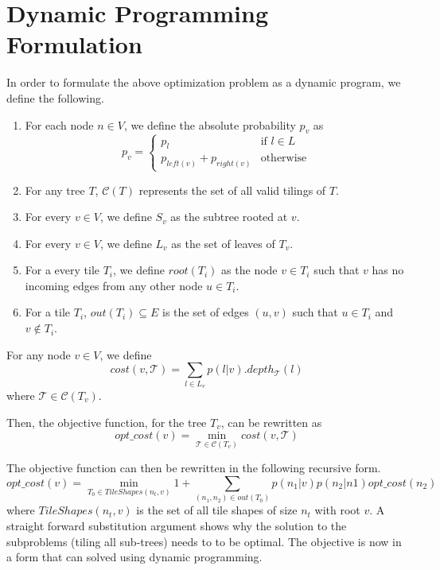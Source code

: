 \section{Dynamic Programming Formulation}
In order to formulate the above optimization problem as a dynamic program, we define the following.
\begin{enumerate}
    \item For each node $n \in V$, we define the absolute probability $p_v$ as
    \begin{equation}
        p_v = \begin{cases}
        p_l &\text{if $l \in L$}\\
        p_{left(v)} + p_{right(v)} &\text{otherwise}
        \end{cases}
    \end{equation}
    \item For any tree $T$, $\mathcal{C}(T)$ represents the set of all valid tilings of $T$.
    \item For every $v \in V$, we define $S_v$ as the subtree rooted at $v$.
    \item For every $v \in V$, we define $L_v$ as the set of leaves of $T_v$.
    \item For a every tile $T_i$, we define $root(T_i)$ as the node $v \in T_i$ such that $v$ has no incoming edges from any other node $u \in T_i$.
    \item For a tile $T_i$, $out(T_i) \subseteq E$ is the set of edges $(u, v)$ such that $u \in T_i$ and $v \notin T_i$.
\end{enumerate}

For any node $v \in V$, we define
\[
    cost(v, \mathcal{T}) = \sum_{l \in L_v} p(l | v).depth_{\mathcal{T}}(l)
\]
where $\mathcal{T} \in \mathcal{C}(T_v)$.

Then, the objective function, for the tree $T_v$, can be rewritten as 
\[
    opt\_cost(v) = \min_{\mathcal{T} \in \mathcal{C}(T_v)}{cost(v, \mathcal{T})}
\]

The objective function can then be rewritten in the following recursive form.
\[
    opt\_cost(v) = \min_{T_0 \in TileShapes(n_t, v)}{1 + \sum_{(n_1, n_2) \in out(T_0)} p(n_1 | v)p(n_2 | n1)opt\_cost(n_2)}
\]
where $TileShapes(n_t, v)$ is the set of all tile shapes of size $n_t$ with root $v$. A straight forward substitution argument shows why the solution to the subproblems (tiling all sub-trees) needs to to be optimal. The objective is now in a form that can solved using
dynamic programming. 

